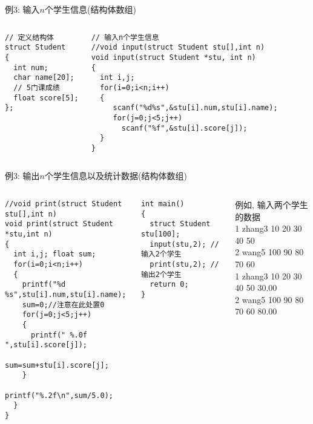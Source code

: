 \begin{frame}{例3: 输入$n$个学生信息(结构体数组)}
\begin{columns}[T]
\begin{lstlisting}
// 定义结构体
struct Student 
{ 
  int num;
  char name[20];
  // 5门课成绩
  float score[5];
};
\end{lstlisting}
\begin{lstlisting}[frame=leftline]
// 输入n个学生信息
//void input(struct Student stu[],int n)
void input(struct Student *stu, int n)
{
  int i,j;
  for(i=0;i<n;i++) 
  {
     scanf("%d%s",&stu[i].num,stu[i].name);
     for(j=0;j<5;j++) 
       scanf("%f",&stu[i].score[j]);
  } 
}
\end{lstlisting}
\end{columns}
\end{frame}

\begin{frame}{例3: 输出$n$个学生信息以及统计数据(结构体数组)}
\vspace{-0.5cm}
\begin{columns}[T]
\begin{lstlisting}
//void print(struct Student stu[],int n)
void print(struct Student *stu,int n)
{
  int i,j; float sum;
  for(i=0;i<n;i++)
  {
    printf("%d %s",stu[i].num,stu[i].name);
    sum=0;//注意在此处置0
    for(j=0;j<5;j++)
    { 
      printf(" %.0f ",stu[i].score[j]);
      sum=sum+stu[i].score[j];
    }
    printf("%.2f\n",sum/5.0);
  }
}
\end{lstlisting}
\begin{lstlisting}[frame=leftline]
int main()
{ 
  struct Student stu[100];
  input(stu,2); // 输入2个学生
  print(stu,2); // 输出2个学生
  return 0;
}
\end{lstlisting}
例如, 输入两个学生的数据\\
1 zhang3 10 20 30 40 50\\
2 wang5 100 90 80 70 60\\
1 zhang3 10  20  30  40  50 30.00\\
2 wang5 100  90  80  70  60 80.00
\end{columns}
\medskip
\end{frame}


